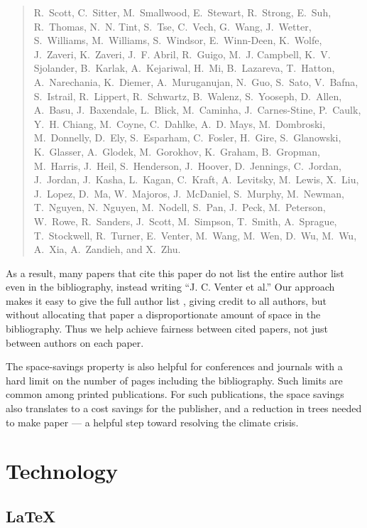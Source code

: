 \documentclass[natbib,authoryear]{sigtbd17-style}
\begin{document}
\begin{quote}
  R.~Scott, C.~Sitter, M.~Smallwood, E.~Stewart, R.~Strong, E.~Suh, R.~Thomas,
  N.~N. Tint, S.~Tse, C.~Vech, G.~Wang, J.~Wetter, S.~Williams, M.~Williams,
  S.~Windsor, E.~Winn-Deen, K.~Wolfe, J.~Zaveri, K.~Zaveri, J.~F. Abril,
  R.~Guigo, M.~J. Campbell, K.~V. Sjolander, B.~Karlak, A.~Kejariwal, H.~Mi,
  B.~Lazareva, T.~Hatton, A.~Narechania, K.~Diemer, A.~Muruganujan, N.~Guo,
  S.~Sato, V.~Bafna, S.~Istrail, R.~Lippert, R.~Schwartz, B.~Walenz,
  S.~Yooseph, D.~Allen, A.~Basu, J.~Baxendale, L.~Blick, M.~Caminha,
  J.~Carnes-Stine, P.~Caulk, Y.~H. Chiang, M.~Coyne, C.~Dahlke, A.~D. Mays,
  M.~Dombroski, M.~Donnelly, D.~Ely, S.~Esparham, C.~Fosler, H.~Gire,
  S.~Glanowski, K.~Glasser, A.~Glodek, M.~Gorokhov, K.~Graham, B.~Gropman,
  M.~Harris, J.~Heil, S.~Henderson, J.~Hoover, D.~Jennings, C.~Jordan,
  J.~Jordan, J.~Kasha, L.~Kagan, C.~Kraft, A.~Levitsky, M.~Lewis, X.~Liu,
  J.~Lopez, D.~Ma, W.~Majoros, J.~McDaniel, S.~Murphy, M.~Newman, T.~Nguyen,
  N.~Nguyen, M.~Nodell, S.~Pan, J.~Peck, M.~Peterson, W.~Rowe, R.~Sanders,
  J.~Scott, M.~Simpson, T.~Smith, A.~Sprague, T.~Stockwell, R.~Turner,
  E.~Venter, M.~Wang, M.~Wen, D.~Wu, M.~Wu, A.~Xia, A.~Zandieh, and X.~Zhu.
\end{quote}

As a result, many papers that cite this paper do not list the entire
author list even in the bibliography, instead writing ``J. C. Venter et al.''
Our approach makes it easy to give the full author list \cite{human-genome},
giving credit to all authors, but without allocating that paper a
disproportionate amount of space in the bibliography.
Thus we help achieve fairness between cited papers, not just between authors
on each paper.

The space-savings property is also helpful for conferences and journals
with a hard limit on the number of pages including the bibliography.
Such limits are common among printed publications.
For such publications, the space savings also translates to a cost savings
for the publisher, and a reduction in trees needed to make paper ---
a helpful step toward resolving the climate crisis.

\section{Technology}

\subsection{\LaTeX}
\end{document}
